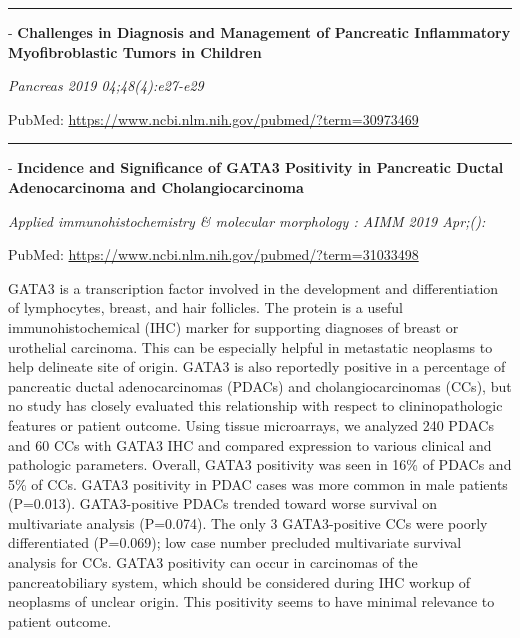 \documentclass[]{article}
\begin{document}
{}

\begin{center}\rule{0.5\linewidth}{\linethickness}\end{center}

 - \textbf{Challenges in Diagnosis and Management of Pancreatic
Inflammatory Myofibroblastic Tumors in Children}

\emph{Pancreas 2019 04;48(4):e27-e29}

PubMed: \url{https://www.ncbi.nlm.nih.gov/pubmed/?term=30973469}

{}

{}

\begin{center}\rule{0.5\linewidth}{\linethickness}\end{center}

 - \textbf{Incidence and Significance of GATA3 Positivity in Pancreatic
Ductal Adenocarcinoma and Cholangiocarcinoma}

\emph{Applied immunohistochemistry \& molecular morphology : AIMM 2019
Apr;():}

PubMed: \url{https://www.ncbi.nlm.nih.gov/pubmed/?term=31033498}

GATA3 is a transcription factor involved in the development and
differentiation of lymphocytes, breast, and hair follicles. The protein
is a useful immunohistochemical (IHC) marker for supporting diagnoses of
breast or urothelial carcinoma. This can be especially helpful in
metastatic neoplasms to help delineate site of origin. GATA3 is also
reportedly positive in a percentage of pancreatic ductal adenocarcinomas
(PDACs) and cholangiocarcinomas (CCs), but no study has closely
evaluated this relationship with respect to clininopathologic features
or patient outcome. Using tissue microarrays, we analyzed 240 PDACs and
60 CCs with GATA3 IHC and compared expression to various clinical and
pathologic parameters. Overall, GATA3 positivity was seen in 16\% of
PDACs and 5\% of CCs. GATA3 positivity in PDAC cases was more common in
male patients (P=0.013). GATA3-positive PDACs trended toward worse
survival on multivariate analysis (P=0.074). The only 3 GATA3-positive
CCs were poorly differentiated (P=0.069); low case number precluded
multivariate survival analysis for CCs. GATA3 positivity can occur in
carcinomas of the pancreatobiliary system, which should be considered
during IHC workup of neoplasms of unclear origin. This positivity seems
to have minimal relevance to patient outcome.

{}
\end{document}

